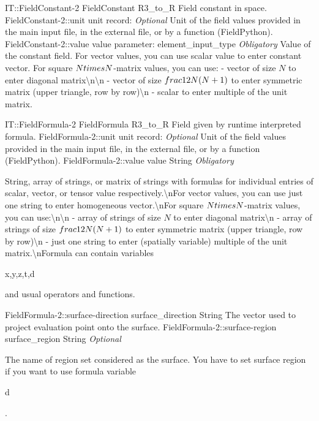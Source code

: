 \begin{RecordType}
	{IT::FieldConstant-2}
	{FieldConstant}
	{}%
	{}%
	{{{R3{\_}to{\_}R Field constant in space.}%
}}
		\RecKey
			{FieldConstant-2::unit}
			{unit}
			{{record: }}{}
			{ \it{Optional}}
			{{{Unit of the field values provided in the main input file, in the external file, or by a function (FieldPython).}%
}}
		\RecKey
			{FieldConstant-2::value}
			{value}
			{{parameter: element{\_}input{\_}type}}{}
			{ \it{Obligatory}}
			{{{Value of the constant field.
For vector values, you can use scalar value to enter constant vector.
For square }{$N\\times N$}{-matrix values, you can use:  - vector of size }{$N$}{ to enter diagonal matrix{\textbackslash}n{\textbackslash}n - vector of size }{$\\frac12N(N+1)$}{ to enter symmetric matrix (upper triangle, row by row){\textbackslash}n - scalar to enter multiple of the unit matrix.}%
}}
\end{RecordType}
\begin{RecordType}
	{IT::FieldFormula-2}
	{FieldFormula}
	{}%
	{}%
	{{{R3{\_}to{\_}R Field given by runtime interpreted formula.}%
}}
		\RecKey
			{FieldFormula-2::unit}
			{unit}
			{{record: }}{}
			{ \it{Optional}}
			{{{Unit of the field values provided in the main input file, in the external file, or by a function (FieldPython).}%
}}
		\RecKey
			{FieldFormula-2::value}
			{value}
			{{String}}{}
			{ \it{Obligatory}}
			{{{String, array of strings, or matrix of strings with formulas for individual entries of scalar, vector, or tensor value respectively.{\textbackslash}nFor vector values, you can use just one string to enter homogeneous vector.{\textbackslash}nFor square }{$N\\times N$}{-matrix values, you can use:{\textbackslash}n{\textbackslash}n - array of strings of size }{$N$}{ to enter diagonal matrix{\textbackslash}n - array of strings of size }{$\\frac12N(N+1)$}{ to enter symmetric matrix (upper triangle, row by row){\textbackslash}n - just one string to enter (spatially variable) multiple of the unit matrix.{\textbackslash}nFormula can contain variables }\begin{ttfamily}x,y,z,t,d\end{ttfamily}{ and usual operators and functions.}%
}}
		\RecKey
			{FieldFormula-2::surface-direction}
			{surface{\_}direction}
			{{String}}{}
			{ }
			{{{The vector used to project evaluation point onto the surface.}%
}}
		\RecKey
			{FieldFormula-2::surface-region}
			{surface{\_}region}
			{{String}}{}
			{ \it{Optional}}
			{{{The name of region set considered as the surface.
You have to set surface region if you want to use formula variable }\begin{ttfamily}d\end{ttfamily}{.}%
}}
\end{RecordType}
